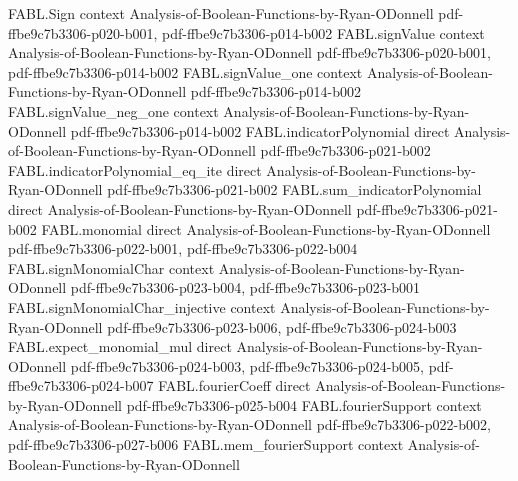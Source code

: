 \begin{theorem}
\label{FABL.variance_eq_four_mul_relativeHammingDist_one_mul_neg_one}
\leanok
{}
\proofstep
  {FABL.Sign}
  {context}
  {Analysis-of-Boolean-Functions-by-Ryan-ODonnell}
  {pdf-ffbe9c7b3306-p020-b001,
    pdf-ffbe9c7b3306-p014-b002}
\proofstep
  {FABL.signValue}
  {context}
  {Analysis-of-Boolean-Functions-by-Ryan-ODonnell}
  {pdf-ffbe9c7b3306-p020-b001,
    pdf-ffbe9c7b3306-p014-b002}
\proofstep
  {FABL.signValue_one}
  {context}
  {Analysis-of-Boolean-Functions-by-Ryan-ODonnell}
  {pdf-ffbe9c7b3306-p014-b002}
\proofstep
  {FABL.signValue_neg_one}
  {context}
  {Analysis-of-Boolean-Functions-by-Ryan-ODonnell}
  {pdf-ffbe9c7b3306-p014-b002}
\proofstep
  {FABL.indicatorPolynomial}
  {direct}
  {Analysis-of-Boolean-Functions-by-Ryan-ODonnell}
  {pdf-ffbe9c7b3306-p021-b002}
\proofstep
  {FABL.indicatorPolynomial_eq_ite}
  {direct}
  {Analysis-of-Boolean-Functions-by-Ryan-ODonnell}
  {pdf-ffbe9c7b3306-p021-b002}
\proofstep
  {FABL.sum_indicatorPolynomial}
  {direct}
  {Analysis-of-Boolean-Functions-by-Ryan-ODonnell}
  {pdf-ffbe9c7b3306-p021-b002}
\proofstep
  {FABL.monomial}
  {direct}
  {Analysis-of-Boolean-Functions-by-Ryan-ODonnell}
  {pdf-ffbe9c7b3306-p022-b001,
    pdf-ffbe9c7b3306-p022-b004}
\proofstep
  {FABL.signMonomialChar}
  {context}
  {Analysis-of-Boolean-Functions-by-Ryan-ODonnell}
  {pdf-ffbe9c7b3306-p023-b004,
    pdf-ffbe9c7b3306-p023-b001}
\proofstep
  {FABL.signMonomialChar_injective}
  {context}
  {Analysis-of-Boolean-Functions-by-Ryan-ODonnell}
  {pdf-ffbe9c7b3306-p023-b006,
    pdf-ffbe9c7b3306-p024-b003}
\proofstep
  {FABL.expect_monomial_mul}
  {direct}
  {Analysis-of-Boolean-Functions-by-Ryan-ODonnell}
  {pdf-ffbe9c7b3306-p024-b003,
    pdf-ffbe9c7b3306-p024-b005,
    pdf-ffbe9c7b3306-p024-b007}
\proofstep
  {FABL.fourierCoeff}
  {direct}
  {Analysis-of-Boolean-Functions-by-Ryan-ODonnell}
  {pdf-ffbe9c7b3306-p025-b004}
\proofstep
  {FABL.fourierSupport}
  {context}
  {Analysis-of-Boolean-Functions-by-Ryan-ODonnell}
  {pdf-ffbe9c7b3306-p022-b002,
    pdf-ffbe9c7b3306-p027-b006}
\proofstep
  {FABL.mem_fourierSupport}
  {context}
  {Analysis-of-Boolean-Functions-by-Ryan-ODonnell}

\end{theorem}
